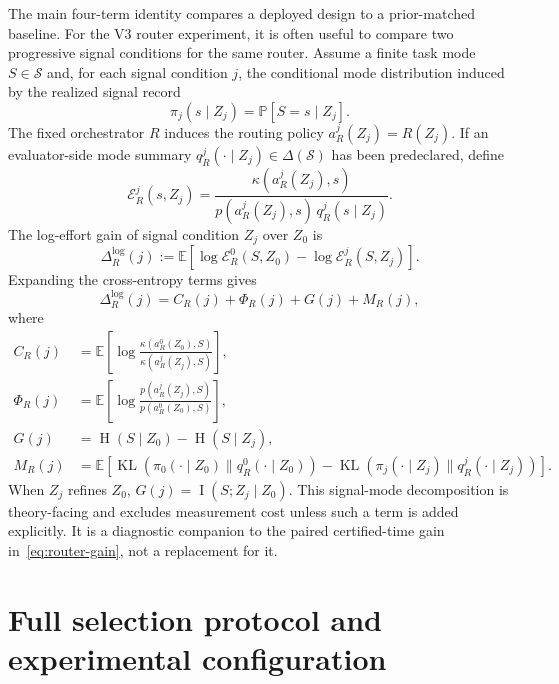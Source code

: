 \documentclass{article}
\DeclareMathOperator{\KL}{KL}
\DeclareMathOperator{\MI}{I}
\DeclareMathOperator{\Hent}{H}
\newcommand{\cS}{\mathcal{S}}
\newcommand{\E}{\mathbb{E}}
\newcommand{\Prb}{\mathbb{P}}
\begin{document}
The main four-term identity compares a deployed design to a prior-matched baseline.
For the V3 router experiment, it is often useful to compare two progressive signal conditions for the same router.
Assume a finite task mode $S\in\cS$ and, for each signal condition $j$, the conditional mode distribution induced by the realized signal record
\[
\pi_j(s\mid Z_j)=\Prb[S=s\mid Z_j].
\]
The fixed orchestrator $R$ induces the routing policy $a_R^j(Z_j)=R(Z_j)$.
If an evaluator-side mode summary $q_R^j(\cdot\mid Z_j)\in\Delta(\cS)$ has been predeclared, define
\[
\mathcal E_R^j(s,Z_j)
=
\frac{\kappa(a_R^j(Z_j),s)}
{p(a_R^j(Z_j),s)\,q_R^j(s\mid Z_j)} .
\]
The log-effort gain of signal condition $Z_j$ over $Z_0$ is
\[
\Delta_R^{\log}(j)
:=
\E[
\log \mathcal E_R^0(S,Z_0)-\log \mathcal E_R^j(S,Z_j)
].
\]
Expanding the cross-entropy terms gives
\[
\Delta_R^{\log}(j)
=
C_R(j)+\Phi_R(j)+G(j)+M_R(j),
\]
where
\begin{align*}
C_R(j)
&=
\E\!\left[
\log\frac{\kappa(a_R^0(Z_0),S)}{\kappa(a_R^j(Z_j),S)}
\right],
\\
\Phi_R(j)
&=
\E\!\left[
\log\frac{p(a_R^j(Z_j),S)}{p(a_R^0(Z_0),S)}
\right],
\\
G(j)
&=
\Hent(S\mid Z_0)-\Hent(S\mid Z_j),
\\
M_R(j)
&=
\E\!\left[
\KL(\pi_0(\cdot\mid Z_0)\|q_R^0(\cdot\mid Z_0))
-
\KL(\pi_j(\cdot\mid Z_j)\|q_R^j(\cdot\mid Z_j))
\right].
\end{align*}
When $Z_j$ refines $Z_0$, $G(j)=\MI(S;Z_j\mid Z_0)$.
This signal-mode decomposition is theory-facing and excludes measurement cost unless such a term is added explicitly.
It is a diagnostic companion to the paired certified-time gain in~\eqref{eq:router-gain}, not a replacement for it.

\section{Full selection protocol and experimental configuration}
\label{app:experiment-details}
\end{document}
